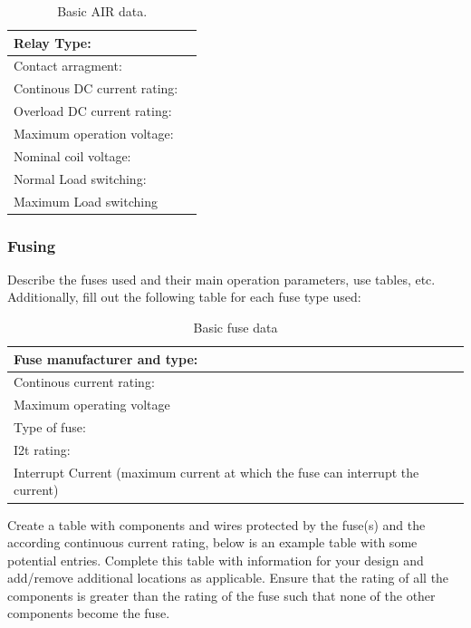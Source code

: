\begin{table}[H]
	\centering
	\caption{Basic AIR data.}
	\begin{tabularx}{\textwidth}{|X|X|}
		\hline
		Relay Type: &  \\[\TableSize]
		\hline
		Contact arragment: &  \\[\TableSize]
		\hline
		Continous DC current rating: &  \\[\TableSize]
		\hline
		Overload DC current rating:  &  \\[\TableSize]
		\hline
		Maximum operation voltage: &  \\[\TableSize]
		\hline
		Nominal coil voltage: &  \\[\TableSize]
		\hline
		Normal Load switching: & \\[\TableSize]
		\hline
		Maximum Load switching &  \\[\TableSize]
		\hline
	\end{tabularx}%
	\label{tab:acc-air}%
\end{table}%

\subsubsection{Fusing}
Describe the fuses used and their main operation parameters, use tables, etc.
Additionally, fill out the following table for each fuse type used:

\begin{table}[H]
	\centering
	\caption{Basic fuse data}
	\begin{tabularx}{\textwidth}{|X|X|}
		\hline
		Fuse manufacturer and type: &  \\[\TableSize]
		\hline
		Continous current rating:  &  \\[\TableSize]
		\hline
		Maximum operating voltage  &  \\[\TableSize]
		\hline
		Type of fuse: &  \\[\TableSize]
		\hline
		I2t rating: &  \\[\TableSize]
		\hline
		Interrupt Current (maximum current at which the fuse can interrupt the current) &  \\[\TableSize]
		\hline
	\end{tabularx}%
	\label{tab:acc-fuse}%
\end{table}%

Create a table with components and wires protected by the fuse(s) and the according continuous current rating, below is an example table with some potential entries.  Complete this table with information for your design and add/remove additional locations as applicable.  Ensure that the rating of all the components is greater than the rating of the fuse such that none of the other components become the fuse.

